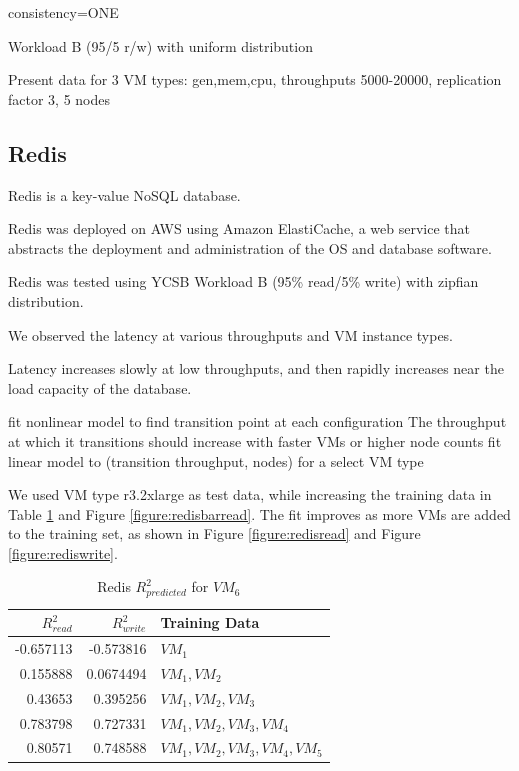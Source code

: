 \documentclass{acm_proc_article-sp}
\begin{document}
consistency=ONE

Workload B (95/5 r/w) with uniform distribution

Present data for
3 VM types: gen,mem,cpu, throughputs 5000-20000, replication factor 3, 5 nodes

\subsection{Redis}

Redis is a key-value NoSQL database.

Redis was deployed on AWS using Amazon ElastiCache, a web service that abstracts the deployment and administration of the OS and database software.

Redis was tested using YCSB Workload B (95\% read/5\% write) with zipfian distribution.

We observed the latency at various throughputs and VM instance types.

Latency increases slowly at low throughputs, and then rapidly increases near the load capacity of the database.

fit nonlinear model to find transition point at each configuration
The throughput at which it transitions should increase with faster VMs or higher node counts  
fit linear model to (transition throughput, nodes) for a select VM type

We used VM type r3.2xlarge as test data, while increasing the training data in Table \ref{table:redis} and Figure \ref{figure:redisbarread}.  The fit improves as more VMs are added to the training set, as shown in Figure \ref{figure:redisread} and Figure \ref{figure:rediswrite}.

\begin{table}
\centering
\caption{Redis $R_{predicted}^2$ for $VM_6$}
\begin{tabular}{|r|r|l|} \hline
$R_{read}^2$&$R_{write}^2$&Training Data\\ \hline
-0.657113 & -0.573816 & $VM_1$\\ \hline
0.155888 & 0.0674494 & $VM_1,VM_2$\\ \hline
0.43653 & 0.395256 & $VM_1,VM_2,VM_3$\\ \hline
0.783798 & 0.727331 & $VM_1,VM_2,VM_3,VM_4$\\ \hline
0.80571 & 0.748588 & $VM_1,VM_2,VM_3,VM_4,VM_5$\\ \hline
\hline\end{tabular}
\label{table:redis}
\end{table}
\end{document}
